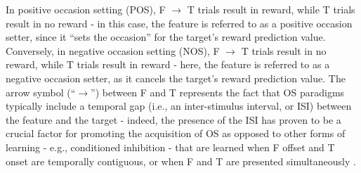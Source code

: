 \documentclass[11pt]{article}
\let\cite=\citep
\begin{document}
In positive occasion setting (POS), F $\rightarrow$ T trials result in reward, 
while T trials result in no reward - in this case, the feature is referred to 
as a positive occasion setter, since it ``sets the occasion'' for the target's 
reward prediction value. Conversely, in negative occasion setting (NOS), F $
\rightarrow$ T trials result in no reward, while T trials result in reward - 
here, the feature is referred to as a negative occasion setter, as it cancels 
the target's reward prediction value. The arrow symbol (``$\rightarrow$'') 
between F and T represents the fact that OS paradigms typically include a 
temporal gap (i.e., an inter-stimulus interval, or ISI) between the feature and 
the target - indeed, the presence of the ISI has proven to be a crucial factor 
for promoting the acquisition of OS as opposed to other forms of learning - 
e.g., conditioned inhibition \cite{Rescorla1969} - that are learned when F 
offset and T onset are temporally contiguous, or when F and T are presented 
simultaneously \cite{Holland1992}. 
\end{document}

